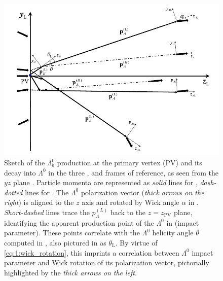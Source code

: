 \begin{figure}[t]
	\centering
	\includegraphics[scale=0.7]{graphics/01-standard_model/heavy-baryon-production.pdf}
	\caption{Sketch of the $\Lambda_b^0$ production at the primary vertex (PV) and its decay into $\Lambda^0$ in the three \shad, \slambda and \slambdal frames of reference, as seen from the \slab $yz$ plane \cite{EMDipoleSearch}. Particle momenta are represented as \textit{solid} lines for \slab, \textit{dash-dotted} lines for \shad.
	The $\Lambda^0$ polarization vector (\textit{thick arrows on the right}) is aligned to the \slambda $z$ axis and rotated by Wick angle $\alpha$ in \slambdal.
	\textit{Short-dashed} lines trace the $p_\Lambda^{(L)}$ back to the $z=z_\text{PV}$ plane, identifying the apparent production point of the $\Lambda^0$ in \slab (impact parameter).
	These points correlate with the $\Lambda^0$ helicity angle $\theta$ computed in \shad, also pictured in \slab as $\theta_\text{L}$.
	By virtue of \eqref{eq:1:wick_rotation}, this imprints a correlation between $\Lambda^0$ impact parameter and Wick rotation of its polarization vector, pictorially highlighted by the \textit{thick arrows on the left}.
	}
	\label{fig:1:heavy-baryon-production}
\end{figure}

